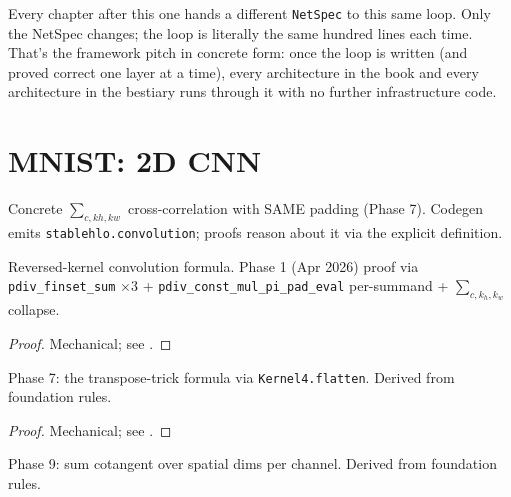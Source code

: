 Every chapter after this one hands a different \texttt{NetSpec} to
this same loop. Only the NetSpec changes; the loop is literally
the same hundred lines each time. That's the framework pitch in
concrete form: once the loop is written (and proved correct one
layer at a time), every architecture in the book and every
architecture in the bestiary runs through it with no further
infrastructure code.

\chapter{MNIST: 2D CNN}
\label{chap:cnn}

\begin{definition}
  \label{ax:conv2d}
  \leanok
  Concrete \(\sum_{c,kh,kw}\) cross-correlation with SAME padding (Phase 7).
  Codegen emits \texttt{stablehlo.convolution}; proofs reason about it
  via the explicit definition.
\end{definition}

\begin{theorem}
  \label{ax:conv2d_has_vjp3}
  \leanok
  Reversed-kernel convolution formula. Phase 1 (Apr 2026) proof
  via \texttt{pdiv\_finset\_sum} \(\times 3\) +
  \texttt{pdiv\_const\_mul\_pi\_pad\_eval} per-summand +
  \(\sum_{c,k_h,k_w}\) collapse.
\end{theorem}

\begin{proof}
\leanok
Mechanical; see .
\end{proof}

\begin{theorem}
  \label{ax:conv2d_weight_grad_has_vjp}
  \leanok
  Phase 7: the transpose-trick formula via \texttt{Kernel4.flatten}.
  Derived from foundation rules.
\end{theorem}

\begin{proof}
\leanok
Mechanical; see .
\end{proof}

\begin{theorem}
  \label{ax:conv2d_bias_grad_has_vjp}
  \leanok
  Phase 9: sum cotangent over spatial dims per channel.
  Derived from foundation rules.
\end{theorem}

